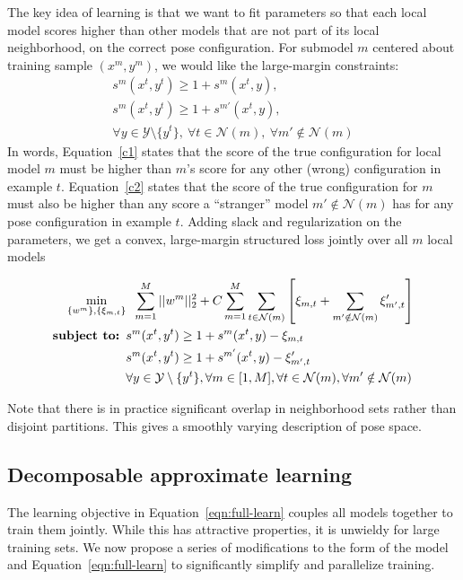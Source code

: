The key idea of learning is that we want to fit parameters so that each local model scores higher than other models that are not part of its local neighborhood, on the correct pose configuration.  For submodel $m$ centered about training sample $(x^m,y^m)$, we would like the large-margin constraints:
\begin{align}
s^m(x^t,y^t) \geq 1 + s^{m}(x^t,y), \label{c1}\\
s^m(x^t,y^t) \geq 1 + s^{m'}(x^t,y),\label{c2}\\
\forall y \in \mathcal{Y}\setminus \{y^t\},~\forall t \in 
\mathcal{N}(m),~\forall m' \notin \mathcal{N}(m) \nonumber
\end{align}
In words, Equation~\ref{c1} states that the score of the true configuration for 
local model $m$ must be higher than $m$'s score for any other (wrong) 
configuration in example $t$.  Equation~\ref{c2} states that the score of the 
true configuration for $m$ must also be higher than any score a ``stranger'' 
model $m' \notin \mathcal{N}(m)$ has for any pose configuration in example $t$.  
Adding slack and regularization on the parameters, we get a convex, 
large-margin structured loss jointly over all $m$ local models

\begin{align}\label{eqn:full-learn}
\min_{\{w^m\}, \{\xi_{m,t}\}}& \;\; \sum_{m=1}^M ||w^m||_2^2 + C \sum_{m=1}^M 
\sum_{t \in \mathcal{N}(m)} \left[ \xi_{m,t} + \sum_{m' \notin \mathcal{N}(m)} 
\xi'_{m',t} \right] \\
\text{\bf{subject to:} }
&s^m(x^t,y^t) \geq 1 + s^{m}(x^t,y) - \xi_{m,t}\\
&s^m(x^t,y^t) \geq 1 + s^{m'}(x^t,y) - \xi'_{m',t}\\
&\forall y \in \mathcal{Y}\setminus \{y^t\}, \forall m \in [1,M], \forall t \in 
\mathcal{N}(m), \forall m' \notin \mathcal{N}(m) \nonumber \end{align}

Note that there is in practice significant overlap in neighborhood sets rather than disjoint partitions.  This gives a smoothly varying description of pose space.

\subsection{Decomposable approximate learning}
The learning objective in Equation~\ref{eqn:full-learn} couples all models together to train them jointly.  While this has attractive properties, it is unwieldy for large training sets.  We now propose a series of modifications to the form of the model and Equation~\ref{eqn:full-learn} to significantly simplify and parallelize training.

